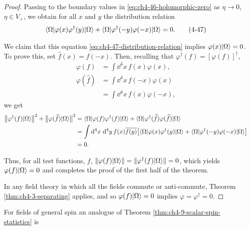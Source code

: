 \begin{proof}
Passing to the boundary values in \eqref{eq:ch4-46-holomorphic-zero} as $\eta\to0$, $\eta\in V_+$, we
obtain for all $x$ and $y$ the distribution relation
\begin{equation}
  \langle \Omega\rvert\varphi(x)\varphi^\dagger(y)\lvert \Omega\rangle
  +\langle \Omega\rvert\varphi^\dagger(-y)\varphi(-x)\lvert \Omega\rangle=0.
  \tag{4-47}\label{eq:ch4-47-distribution-relation}
\end{equation}

We claim that this equation \eqref{eq:ch4-47-distribution-relation} implies $\varphi(x)\lvert \Omega\rangle=0$.  To
prove this, set $\widehat f(x)=f(-x)$.  Then, recalling that
$\varphi^\dagger(f)=[\varphi(f)]^\dagger$,
\begin{equation*}
\begin{aligned}
  \varphi(f)&=\int\dd^4x\,f(x)\varphi(x),\\
  \varphi(\widehat f)&=\int\dd^4x\,f(-x)\varphi(x)\\
    &=\int\dd^4x\,f(x)\varphi(-x),
\end{aligned}
\end{equation*}
we get
\begin{equation*}
\begin{aligned}
  \bigl\lVert\varphi^\dagger(f)\lvert \Omega\rangle\bigr\rVert^2
  +\bigl\lVert\varphi(\widehat f)\lvert \Omega\rangle\bigr\rVert^2
  &=\langle \Omega\rvert\varphi(f)\varphi^\dagger(f)\lvert \Omega\rangle
    +\langle \Omega\rvert\varphi^\dagger(\widehat f)\varphi(\widehat f)\lvert \Omega\rangle\\
  &=\int\mathop{}\!\mathrm{d}^4x\,\mathop{}\!\mathrm{d}^4y\,f(x)\overline{f(y)}
    \bigl[\langle \Omega\rvert\varphi(x)\varphi^\dagger(y)\lvert \Omega\rangle
    +\langle \Omega\rvert\varphi^\dagger(-y)\varphi(-x)\lvert \Omega\rangle\bigr]\\
  &=0.
\end{aligned}
\end{equation*}

Thus, for all test functions, $f$,
$\lVert\varphi(f)\lvert \Omega\rangle\rVert
=\lVert\varphi^\dagger(f)\lvert \Omega\rangle\rVert=0$, which yields
$\varphi(f)\lvert \Omega\rangle=0$ and completes the proof of the first half of the
theorem.

In any field theory in which all the fields commute or anti-commute, Theorem
\ref{thm:ch4-3-separating} applies, and so $\varphi(f)\lvert \Omega\rangle=0$ implies
$\varphi=\varphi^\dagger=0$.
\end{proof}

For fields of general spin an analogue of Theorem \ref{thm:ch4-9-scalar-spin-statistics} is

